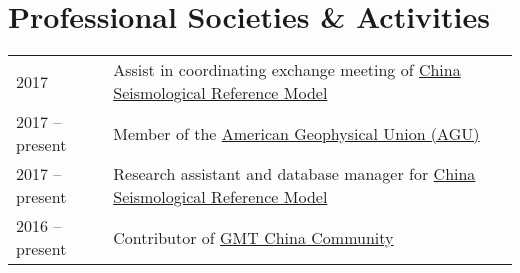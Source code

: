 \section*{Professional Societies \& Activities}

\begin{tabular}{ll}
2017            & Assist in coordinating exchange meeting of \href{http://chinageorefmodel.org/}{China Seismological Reference Model} \\ 
2017 -- present & Member of the \href{https://sites.agu.org/}{American Geophysical Union (AGU)} \\
2017 -- present & Research assistant and database manager for \href{http://chinageorefmodel.org/}{China Seismological Reference Model} \\
2016 -- present & Contributor of \href{http://gmt-china.org/}{GMT China Community} \\
\end{tabular}
